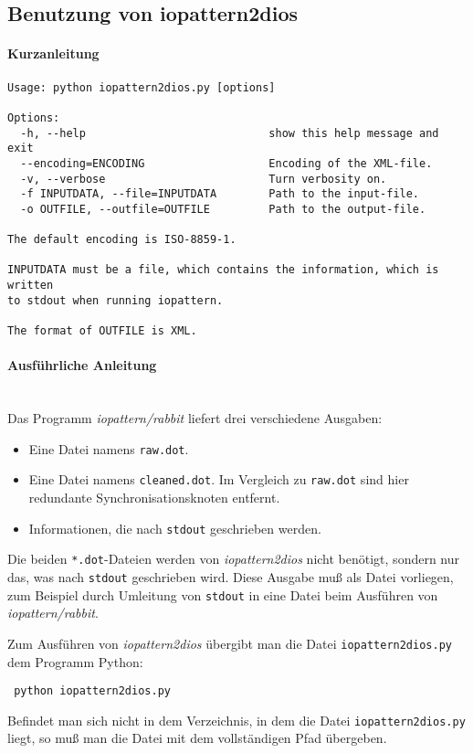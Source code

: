 \documentclass{scrartcl}
\begin{document}
\subsection{Benutzung von iopattern2dios} %
\paragraph{Kurzanleitung}
\begin{verbatim}
Usage: python iopattern2dios.py [options]

Options:
  -h, --help                            show this help message and exit
  --encoding=ENCODING                   Encoding of the XML-file.
  -v, --verbose                         Turn verbosity on.
  -f INPUTDATA, --file=INPUTDATA        Path to the input-file.
  -o OUTFILE, --outfile=OUTFILE         Path to the output-file.

The default encoding is ISO-8859-1.

INPUTDATA must be a file, which contains the information, which is written
to stdout when running iopattern.

The format of OUTFILE is XML.
\end{verbatim}
\paragraph{Ausführliche Anleitung}~\\
Das Programm \emph{iopattern/rabbit} liefert drei verschiedene Ausgaben:
\begin{itemize}
\item Eine Datei namens \texttt{raw.dot}.
\item Eine Datei namens \texttt{cleaned.dot}. Im Vergleich zu \texttt{raw.dot}
	sind hier redundante Synchronisationsknoten entfernt.
\item Informationen, die nach \texttt{stdout} geschrieben werden.
\end{itemize}
Die beiden \texttt{*.dot}-Dateien werden von \emph{iopattern2dios} nicht 
benötigt, sondern nur das, was nach \texttt{stdout} geschrieben wird. 
Diese Ausgabe muß als Datei vorliegen, zum Beispiel durch Umleitung von 
\texttt{stdout} in eine Datei beim Ausführen von \emph{iopattern/rabbit}.

Zum Ausführen von \emph{iopattern2dios} übergibt man die Datei 
\texttt{iopattern2dios.py} dem Programm Python:
\begin{verbatim}
 python iopattern2dios.py
\end{verbatim}
Befindet man sich nicht in dem Verzeichnis, in dem die Datei 
\texttt{iopattern2dios.py} liegt, so muß man die Datei mit dem vollständigen
Pfad übergeben. 
\end{document}
